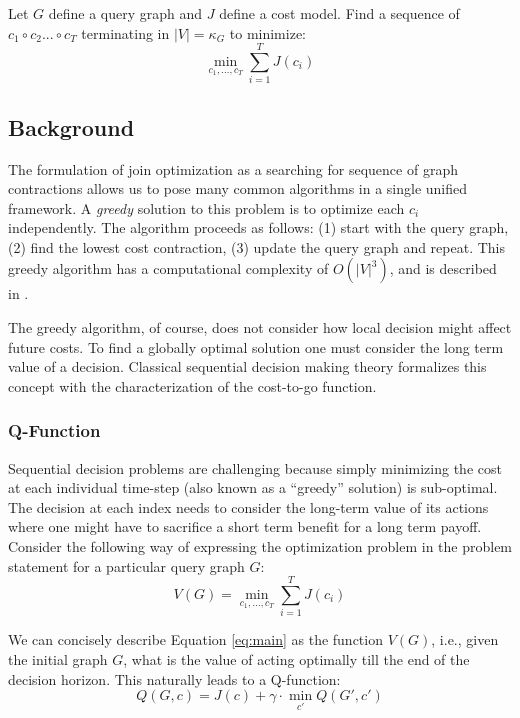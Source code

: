 \begin{problem}
Let $G$ define a query graph and $J$ define a cost model. Find a sequence of $c_1 \circ c_2 ...\circ c_{T}$ terminating in $|V| = \kappa_G$ to minimize:
\[
\min_{c_1,...,c_T} \sum_{i=1}^T J(c_i)
\]
\end{problem}

\subsection*{Background}
The formulation of join optimization as a searching for sequence of graph contractions allows us to pose many common algorithms in a single unified framework. A \emph{greedy} solution to this problem is to optimize each $c_i$ independently. The algorithm proceeds as follows: (1) start with the query graph, (2) find the lowest cost contraction, (3) update the query graph and repeat. This greedy algorithm has a computational complexity of $O(|V|^3)$, and is described in \cite{d}.

The greedy algorithm, of course, does not consider how local decision might affect future costs. To find a globally optimal solution one must consider the long term value of a decision. Classical sequential decision making theory formalizes this concept with the characterization of the cost-to-go function.

\subsubsection{Q-Function}
Sequential decision problems are challenging because simply minimizing the cost at each individual time-step (also known as a ``greedy'' solution) is sub-optimal. The decision at each index needs to consider the long-term value of its actions where one might have to sacrifice a short term benefit for a long term payoff.
Consider the following way of expressing the optimization problem in the problem statement for a particular query graph $G$:
\begin{equation}
V(G) = \min_{c_1,...,c_T} \sum_{i=1}^T J(c_i)
\label{eq:main}
\end{equation}

We can concisely describe Equation \ref{eq:main} as the function $V(G)$, i.e., given the initial graph $G$, what is the value of acting optimally till the end of the decision horizon. This naturally leads to a Q-function:
\begin{equation}
Q(G,c) = J(c) + \gamma \cdot \min_{c'} Q( G',c')
\label{eq:q}
\end{equation}

